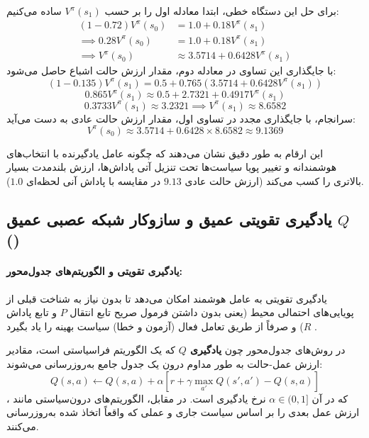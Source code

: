 \documentclass[oneside,openany,phd]{TMU-Thesis}
\begin{document}
برای حل این دستگاه خطی، ابتدا معادله اول را بر حسب $V^\pi(s_1)$ ساده می‌کنیم:
\begin{align*}
(1 - 0.72) V^\pi(s_0) &= 1.0 + 0.18 V^\pi(s_1) \\
\implies 0.28 V^\pi(s_0) &= 1.0 + 0.18 V^\pi(s_1) \\
\implies V^\pi(s_0) &\approx 3.5714 + 0.6428 V^\pi(s_1)
\end{align*}
با جایگذاری این تساوی در معادله دوم، مقدار ارزش حالت اشباع حاصل می‌شود:
$$(1 - 0.135) V^\pi(s_1) = 0.5 + 0.765 \left( 3.5714 + 0.6428 V^\pi(s_1) \right)$$
$$0.865 V^\pi(s_1) \approx 0.5 + 2.7321 + 0.4917 V^\pi(s_1)$$
$$0.3733 V^\pi(s_1) \approx 3.2321 \implies V^\pi(s_1) \approx 8.6582$$
سرانجام، با جایگذاری مجدد در تساوی اول، مقدار ارزش حالت عادی به دست می‌آید:
$$V^\pi(s_0) \approx 3.5714 + 0.6428 \times 8.6582 \approx 9.1369$$

این ارقام به طور دقیق نشان می‌دهند که چگونه عامل یادگیرنده با انتخاب‌های هوشمندانه و تغییر پویا سیاست‌ها تحت تنزیل آتی پاداش‌ها، ارزش بلندمدت بسیار بالاتری را کسب می‌کند (ارزش حالت عادی $9.13$ در مقایسه با پاداش آنی لحظه‌ای $1.0$).

\subsection{یادگیری تقویتی عمیق و سازوکار شبکه عصبی عمیق \texorpdfstring{$Q$}{Q} ()}
\label{subsec:drl_dqn_foundations}

\paragraph{یادگیری تقویتی و الگوریتم‌های جدول‌محور:}

یادگیری تقویتی به عامل هوشمند امکان می‌دهد تا بدون نیاز به شناخت قبلی از پویایی‌های احتمالی محیط (یعنی بدون داشتن فرمول صریح تابع انتقال $P$ و تابع پاداش $R$) و صرفاً از طریق تعامل فعال (آزمون و خطا) سیاست بهینه را یاد بگیرد \cite{sutton2018reinforcement}. 

در روش‌های جدول‌محور چون \textbf{یادگیری $Q$} \cite{watkins1992q} که یک الگوریتم فراسیاستی است، مقادیر ارزش عمل-حالت به طور مداوم درون یک جدول جامع به‌روزرسانی می‌شوند:
$$Q(s, a) \leftarrow Q(s, a) + \alpha \left[ r + \gamma \max_{a'} Q(s', a') - Q(s, a) \right]$$
که در آن $\alpha \in (0, 1]$ نرخ یادگیری است. در مقابل، الگوریتم‌های درون‌سیاستی مانند \textbf{} \cite{rummery1994on-line}، ارزش عمل بعدی را بر اساس سیاست جاری و عملی که واقعاً اتخاذ شده به‌روزرسانی می‌کنند. 
\end{document}
